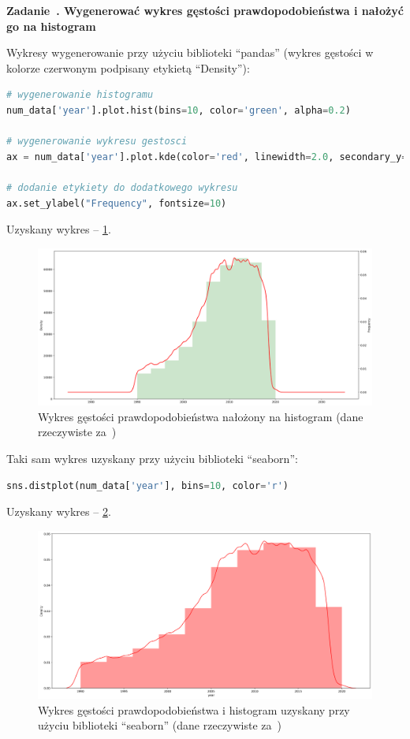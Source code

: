 \documentclass[11pt]{report}
\newcounter{zadanie}
\newcommand{\zadanie}[1]{
    \refstepcounter{zadanie}
    \filbreak\vspace*{1cm}
    {\noindent\raggedright\Large \textbf{Zadanie~\thezadanie. #1}}
    \vspace{10 pt}\nopagebreak[1]
}
\begin{document}
\zadanie{Wygenerować wykres gęstości prawdopodobieństwa i nałożyć go na histogram}

Wykresy wygenerowanie przy użyciu biblioteki \enquote{pandas} (wykres gęstości w kolorze czerwonym podpisany etykietą \enquote{Density}):

\begin{lstlisting}[language=Python]
# wygenerowanie histogramu
num_data['year'].plot.hist(bins=10, color='green', alpha=0.2)

# wygenerowanie wykresu gestosci
ax = num_data['year'].plot.kde(color='red', linewidth=2.0, secondary_y=True)

# dodanie etykiety do dodatkowego wykresu
ax.set_ylabel("Frequency", fontsize=10)
\end{lstlisting}

Uzyskany wykres -- \ref{fig:wykres15}.

\begin{figure}[h]
    \caption{Wykres gęstości prawdopodobieństwa nałożony na histogram (dane rzeczywiste za~\cite{daneMedyczne})}
    \label{fig:wykres15}
    \centering
    \includegraphics[width=.8\textwidth]{wykres16}
\end{figure}

Taki sam wykres uzyskany przy użyciu biblioteki \enquote{seaborn}:

\begin{lstlisting}[language=Python]
sns.distplot(num_data['year'], bins=10, color='r')
\end{lstlisting}

Uzyskany wykres -- \ref{fig:wykres16}.

\begin{figure}[h]
    \caption{Wykres gęstości prawdopodobieństwa i histogram uzyskany przy użyciu biblioteki \enquote{seaborn} (dane rzeczywiste za~\cite{daneMedyczne})}
    \label{fig:wykres16}
    \centering
    \includegraphics[width=.8\textwidth]{wykres17}
\end{figure}
\end{document}
